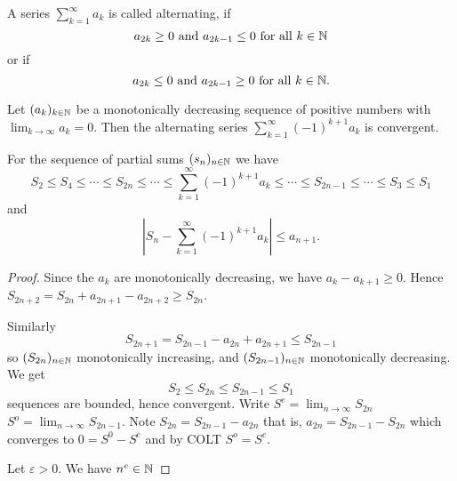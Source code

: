 \documentclass[10pt, a4paper]{article}
\newcommand{\dseq}[2][n]{(#2_#1)_{#1 \in \N}}
\newcommand{\infsum}[1][k = 1]{\sum_{#1}^{\infty}}
\begin{document}
\begin{definition}
    A series $\infsum a_k$ is called alternating,
    if
    \[
    a_{2k} \geq 0\text{ and } a_{2k - 1} \leq 0\text{ for all $k \in \mathbb{N}$}
    \]
    or if 
    \[
    a_{2k} \leq 0\text{ and } a_{2k - 1} \geq 0\text{ for all $k \in \mathbb{N}$}.
    \]
\end{definition}

\begin{theorem}
    Let $\dseq[k]{a}$ be a monotonically decreasing sequence of positive numbers with $\lim_{k \rightarrow \infty}a_k = 0$.
    Then the alternating series $\infsum(-1) ^ {k + 1}a_k$ is convergent.

    For the sequence of partial sums $\dseq{s}$ we have
    \[
    S_2 \leq S_4 \leq \dotsi \leq S_{2n} \leq \dotsi \leq \infsum(-1) ^ {k + 1}a_k \leq \dotsi \leq S_{2n - 1} \leq \dotsi \leq S_3 \leq S_1
    \]
    and
    \[
    \left|S_n - \infsum(-1) ^ {k + 1}a_k\right| \leq a_{n + 1}.
    \]
    \begin{proof}
        Since the $a_k$ are monotonically decreasing,
        we have $a_k - a_{k + 1} \geq 0$.
        Hence $S_{2n + 2} = S_{2n} + a_{2n + 1} - a_{2n + 2} \geq S_{2n}$.
        
        Similarly
        \[
        S_{2n + 1} = S_{2n - 1} - a_{2n} + a_{2n + 1} \leq S_{2n - 1}
        \]
        so $(S_{2n})_{n \in \mathbb{N}}$ monotonically increasing,
        and $(S_{2n - 1})_{n \in \mathbb{N}}$ monotonically decreasing.
        We get
        \[
        S_2 \leq S_{2n} \leq S_{2n - 1} \leq S_1
        \]
        sequences are bounded,
        hence convergent.
        Write $S ^ e = \lim_{n \rightarrow \infty}S_{2n}$
        $S ^ o = \lim_{n \rightarrow \infty}S_{2n - 1}$.
        Note $S_{2n} = S_{2n - 1} - a_{2n}$
        that is,
        $a_{2n} = S_{2n - 1} - S_{2n}$
        which converges to $0 = S ^ 0 - S ^ e$
        and by COLT
        $S ^ o = S ^ e$.

        Let $\varepsilon > 0$.
        We have $n ^ e \in \mathbb{N}$
    \end{proof}
    
\end{theorem}
\end{document}

